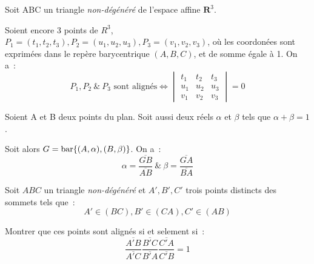 \documentclass[a4paper,french,final,article]{memoir}
\begin{document}
\maketitle
\addtocounter{chapter}{2}
\addtocounter{exercise}{7}
\begin{exercise}[Résultat]\label{ex:barymat}
Soit ABC un triangle \emph{non-dégénéré} de l'espace affine $\mathbf{R}^3$.

\noindent Soient encore 3 points de $R^3$, ${P_1=(t_1,t_2,t_3),P_2=(u_1,u_2,u_3), P_3=(v_1,v_2,v_3)}$,
où les coordonées sont exprimées dans le repère barycentrique $(A,B,C)$, et de somme égale à 1. On a~:
\[\boxed{\text{$P_1,P_2~\&~ P_3$ sont alignés} \iff \begin{vmatrix}
  t_1 & t_2 & t_3 \\ u_1 & u_2 & u_3 \\ v_1 & v_2 & v_3
\end{vmatrix}=0}\] 
\end{exercise}
\begin{exercise}[Résultat]\label{ex:baryfrac}
Soient A et B deux points du plan. Soit aussi deux réels $\alpha$ et $\beta$ tels que $\alpha+\beta=1$. 

\noindent Soit alors $G=\operatorname{bar}\{(A,\alpha),(B,\beta)\}$. 
On a~: 
\[\boxed{\alpha=\frac{\overline{GB}}{\overline{AB}}~\&~\beta=\frac{\overline{GA}}{\overline{BA}}}\]
\end{exercise}
\begin{exercise}
Soit $ABC$ un triangle  \emph{non-dégénéré} et $A',B',C'$ trois points distincts des sommets tels que~: \[A' \in (BC),B'\in (CA), C' \in (AB)\]

\noindent Montrer que ces points sont alignés si et selement si~: 
\[\frac{\overline{A'B}}{\overline{A'C}}\frac{\overline{B'C}}{\overline{B'A}}\frac{\overline{C'A}}{\overline{C'B}}=1\]
\end{exercise}
\end{document}
